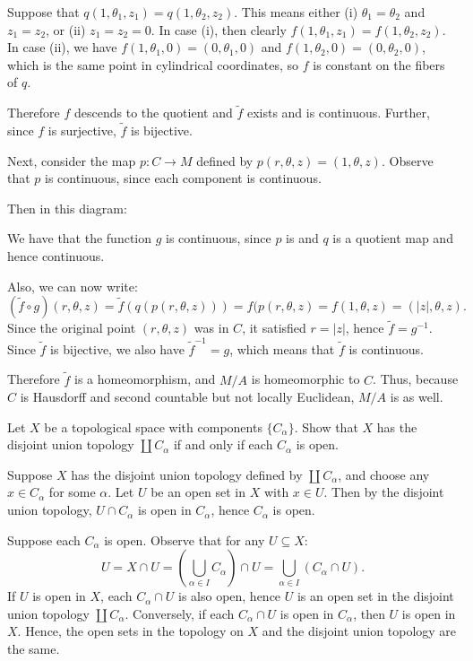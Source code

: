 \documentclass[minion]{homework651}
\newcommand{\nextprob}{\newpage}
\newcommand{\ra}{\rightarrow}
\begin{document}
\begin{aproblems}
Suppose that $q(1,\theta_1,z_1)=q(1,\theta_2,z_2)$.
This means either (i)
$\theta_1=\theta_2$ and $z_1=z_2$, or (ii) $z_1=z_2=0$.  In case (i), then clearly
$f(1,\theta_1,z_1)=f(1,\theta_2,z_2)$.  In case (ii), we have
$f(1,\theta_1,0) = (0,\theta_1,0)$ and $f(1,\theta_2,0)=(0,\theta_2,0)$, which is
the same point in cylindrical coordinates, so $f$ is constant on the fibers of $q$.

Therefore $f$ descends to the quotient and $\tilde f$ exists and is continuous.
Further, since $f$ is surjective, $\tilde f$ is bijective.

Next, consider the map $p:C\ra M$ defined by $p(r,\theta,z)=(1,\theta,z)$.
Observe that $p$ 
is continuous, since each component is continuous.

Then in this diagram:

\centerline{
}

We have that the function $g$ is continuous, since $p$ is and $q$ is a quotient
map and hence continuous.

Also, we can now write:
$$ (\tilde f\circ g)(r,\theta,z)=\tilde f(q(p(r,\theta,z)))=f(p(r,\theta,z)=
   f(1,\theta,z)=(|z|,\theta,z). $$
Since the original point $(r,\theta,z)$ was in $C$, it satisfied $r=|z|$, hence
$\tilde f=g^{-1}$.  Since $\tilde f$ is bijective, we also have $\tilde f^{-1}=g$,
which means that $\tilde f$ is continuous.

Therefore $\tilde f$ is a homeomorphism, and $M/A$ is homeomorphic to $C$.
Thus, because $C$ is Hausdorff and second countable but not locally Euclidean,
$M/A$ is as well.

\nextprob
\hproblem Let $X$ be a topological space with components $\{C_\alpha\}$.
Show that $X$ has the disjoint union topology $\coprod C_\alpha$ if and only if
each $C_\alpha$ is open.

\solution
Suppose $X$ has the disjoint union topology defined by $\coprod C_\alpha$,
and choose any $x\in C_\alpha$ for some $\alpha$.
Let $U$ be an open set in $X$ with $x\in U$.  Then
by the disjoint union topology, $U\cap C_\alpha$ is open in $C_\alpha$,
hence $C_\alpha$ is open.

Suppose each $C_\alpha$ is open.  Observe that for any $U\subseteq X$:
$$U=X\cap U=\left(\bigcup_{\alpha\in I} C_\alpha\right)\cap U=
  \bigcup_{\alpha\in I} (C_\alpha \cap U).$$
If $U$ is open in $X$, each $C_\alpha \cap U$ is also open,
hence $U$ is an open set in the disjoint union topology $\coprod C_\alpha$.
Conversely, if each $C_\alpha\cap U$ is open in $C_\alpha$, then $U$ is
open in $X$.  Hence, the open sets in the topology on $X$ and the
disjoint union topology are the same.


\end{aproblems}
\end{document}
